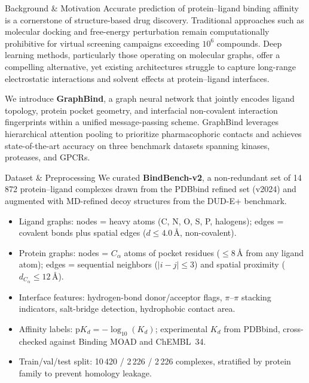 \documentclass[14pt]{extarticle}
\begin{document}
\noindent
\begin{minipage}[t]{0.31\textwidth}
\RaggedRight

\begin{posterblock}{Background \& Motivation}
Accurate prediction of protein--ligand binding affinity is a cornerstone of structure-based drug discovery.
Traditional approaches such as molecular docking and free-energy perturbation remain computationally prohibitive for
virtual screening campaigns exceeding $10^6$ compounds. Deep learning methods, particularly those operating on molecular
graphs, offer a compelling alternative, yet existing architectures struggle to capture long-range electrostatic
interactions and solvent effects at protein--ligand interfaces.

We introduce \textbf{GraphBind}, a graph neural network that jointly encodes ligand topology, protein pocket geometry,
and interfacial non-covalent interaction fingerprints within a unified message-passing scheme. GraphBind leverages
hierarchical attention pooling to prioritize pharmacophoric contacts and achieves state-of-the-art accuracy on three
benchmark datasets spanning kinases, proteases, and GPCRs.
\end{posterblock}

\begin{posterblock}{Dataset \& Preprocessing}
We curated \textbf{BindBench-v2}, a non-redundant set of 14\,872 protein--ligand complexes drawn from the PDBbind
refined set (v2024) and augmented with MD-refined decoy structures from the DUD-E+ benchmark.
\begin{itemize}[leftmargin=*, itemsep=6pt, topsep=6pt]
  \item Ligand graphs: nodes = heavy atoms (C, N, O, S, P, halogens); edges = covalent bonds plus
        spatial edges ($d \leq 4.0\,\text{\AA}$, non-covalent).
  \item Protein graphs: nodes = $C_\alpha$ atoms of pocket residues ($\leq 8\,\text{\AA}$ from any ligand atom);
        edges = sequential neighbors ($|i-j| \leq 3$) and spatial proximity ($d_{C_\alpha} \leq 12\,\text{\AA}$).
  \item Interface features: hydrogen-bond donor/acceptor flags, $\pi$--$\pi$ stacking indicators,
        salt-bridge detection, hydrophobic contact area.
  \item Affinity labels: $\mathrm{p}K_d = -\log_{10}(K_d)$; experimental $K_d$ from PDBbind, cross-checked
        against Binding MOAD and ChEMBL~34.
  \item Train/val/test split: 10\,420 / 2\,226 / 2\,226 complexes, stratified by protein family to prevent
        homology leakage.
\end{itemize}
\end{posterblock}


\end{minipage}
\end{document}
